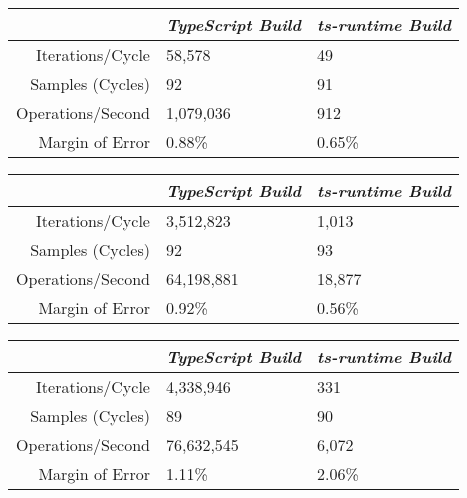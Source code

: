 \begin{center}
{
\centering
\tabulinesep=1.2mm
\setlength{\tabcolsep}{5mm}
\def\arraystretch{1.25}
\small
\begin{tabu} to \textwidth {|r||X[c,m]|X[c,m]|}
  \hline
  & \emph{TypeScript Build} & \emph{ts-runtime Build} \\
  \hline
  \hline
  Iterations/Cycle  & 58,578 & 49 \\
  \hline
  Samples (Cycles)  & 92 & 91 \\
  \hline
  Operations/Second & 1,079,036 & 912 \\
  \hline
  Margin of Error   & 0.88\% & 0.65\% \\
  \hline
\end{tabu}
}
\end{center}

\begin{center}
{
\centering
\tabulinesep=1.2mm
\setlength{\tabcolsep}{5mm}
\def\arraystretch{1.25}
\small
\begin{tabu} to \textwidth {|r||X[c,m]|X[c,m]|}
  \hline
  & \emph{TypeScript Build} & \emph{ts-runtime Build} \\
  \hline
  \hline
  Iterations/Cycle  & 3,512,823 & 1,013 \\
  \hline
  Samples (Cycles)  & 92 & 93 \\
  \hline
  Operations/Second & 64,198,881 & 18,877 \\
  \hline
  Margin of Error   & 0.92\% & 0.56\% \\
  \hline
\end{tabu}
}
\end{center}

\begin{center}
{
\centering
\tabulinesep=1.2mm
\setlength{\tabcolsep}{5mm}
\def\arraystretch{1.25}
\small
\begin{tabu} to \textwidth {|r||X[c,m]|X[c,m]|}
  \hline
  & \emph{TypeScript Build} & \emph{ts-runtime Build} \\
  \hline
  \hline
  Iterations/Cycle  & 4,338,946 & 331 \\
  \hline
  Samples (Cycles)  & 89 & 90 \\
  \hline
  Operations/Second & 76,632,545 & 6,072 \\
  \hline
  Margin of Error   & 1.11\% & 2.06\% \\
  \hline
\end{tabu}
}
\end{center}


